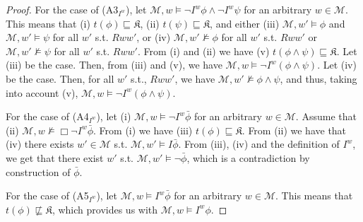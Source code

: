 \documentclass{article}
\begin{document}
\begin{proof}
For the case of (A3$_{I^{w}}$), let $\mathcal{M}, w \models \neg I^{w} \phi \wedge \neg I^{w} \psi$ for an arbitrary $w \in \mathcal{M}$. This means that (i) $t(\phi) \sqsubseteq \mathfrak{K}$, (ii) $t(\psi) \sqsubseteq \mathfrak{K}$, and either (iii) $\mathcal{M}, w' \models \phi$ and $\mathcal{M}, w' \models \psi$ for all $w'$ s.t. $Rww'$, or (iv) $\mathcal{M}, w' \not \models \phi$ for all $w'$ s.t. $Rww'$ or $\mathcal{M}, w' \not \models \psi$ for all $w'$ s.t. $Rww'$. From (i) and (ii) we have (v) $t(\phi \wedge \psi) \sqsubseteq \mathfrak{K}$. Let (iii) be the case. Then, from (iii) and (v), we have $\mathcal{M}, w \models \neg I^{w} (\phi \wedge \psi)$. Let (iv) be the case. Then, for all $w'$ s.t., $Rww'$, we have $\mathcal{M}, w' \not \models \phi \wedge \psi$, and thus, taking into account (v), $\mathcal{M}, w \models \neg I^{w} (\phi \wedge \psi)$.

For the case of (A4$_{I^{w}}$), let (i) $\mathcal{M}, w\models \neg I^{w} \bar{\phi}$ for an arbitrary $w \in \mathcal{M}$. Assume that (ii) $\mathcal{M}, w \not \models \Box \neg I^{w} \bar{\phi}$. From (i) we have (iii) $t(\phi) \sqsubseteq \mathfrak{K}$. From (ii) we have that (iv) there exists $w' \in \mathcal{M}$ s.t. $\mathcal{M}, w' \models I \bar{\phi}$. From (iii), (iv) and the definition of $I^{w}$, we get that there exist $w'$ s.t. $\mathcal{M}, w' \models \neg \bar{\phi}$, which is a contradiction by construction of $\bar{\phi}$.

For the case of (A5$_{I^{w}}$), let $\mathcal{M}, w \models I^{w} \bar{\phi}$ for an arbitrary $w \in \mathcal{M}$. This means that $t(\phi) \not \sqsubseteq \mathfrak{K}$, which provides us with $\mathcal{M}, w \models I^{w} \phi$.


\end{proof}
\end{document}
